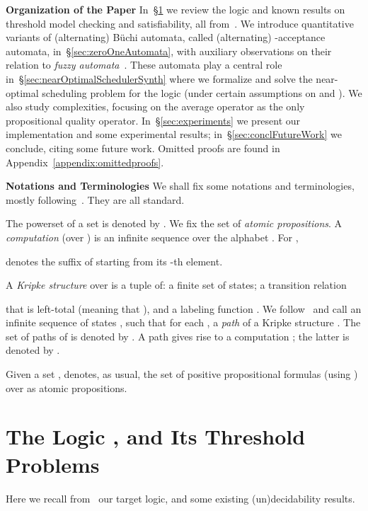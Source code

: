 \documentclass[a4paper,USenglish,numberwithinsect]{lipics}
\theoremstyle{definition}
\theoremstyle{remark}
\theoremstyle{plain}
\begin{document}
\noindent
\textbf{Organization of the Paper} \quad
In~\S{}\ref{sec:syntaxAndThresholdProblem} we review the logic
 and known results on threshold model checking and
satisfiability,
all from~\cite{AlmagorBK14}. We introduce  quantitative
variants of (alternating) B\"uchi automata, called
(alternating)  -acceptance automata,
in~\S{}\ref{sec:zeroOneAutomata}, with  auxiliary observations on their
relation to \emph{fuzzy automata}~\cite{Rahonis05}.
These automata
play a central role in~\S{}\ref{sec:nearOptimalSchedulerSynth} where we
formalize and solve the near-optimal scheduling problem for the logic
 (under certain assumptions on  and ).
We also study complexities, focusing on the average operator  as
the only propositional quality operator. In~\S{}\ref{sec:experiments} we
present our implementation and some experimental results;
in~\S{}\ref{sec:conclFutureWork} we conclude, citing some future work.
Omitted proofs are found in Appendix~\ref{appendix:omittedproofs}.



\noindent
\textbf{Notations and Terminologies} \quad
We shall fix some notations and terminologies, mostly
following~\cite{AlmagorBK14}.  They are all standard.

The powerset of a set  is denoted by .
We fix the set   of \emph{atomic propositions}.
 A
\emph{computation} (over ) is an infinite sequence  over the alphabet
 . 
For , 
 
denotes the suffix of  starting from its -th element.


A \emph{Kripke structure} over  is a tuple  of:  
  a finite set  of states; a  transition
 relation 
  
that is left-total (meaning that ), and a labeling function  . 
We follow~\cite{KupfermanVW00} and call an infinite sequence   of states , such that
  for each ,  a \emph{path} of
  a Kripke structure .
The set of paths of  is
 denoted by . A path
 gives rise to a computation
; the
  latter is  denoted by .

Given a set , 
  denotes, as
 usual, the set of positive propositional formulas (using
 ) over   as atomic
 propositions.




\section{The Logic , and Its Threshold Problems}
\label{sec:syntaxAndThresholdProblem}
Here we recall from~\cite{AlmagorBK13,AlmagorBK14}  our target
logic, and some existing (un)decidability results.
\end{document}
